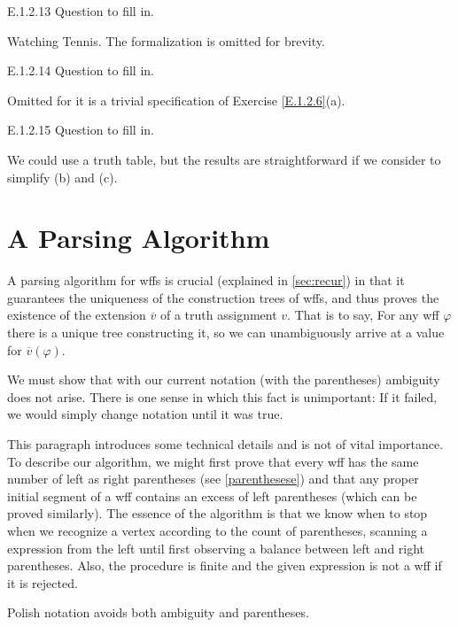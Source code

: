 \begin{exercise}{E.1.2.13}
  Question to fill in.
\end{exercise}

Watching Tennis. The formalization is omitted for brevity.

\begin{exercise}{E.1.2.14}
  Question to fill in.
\end{exercise}

Omitted for it is a trivial specification of Exercise \ref{E.1.2.6}(a).

\begin{exercise}{E.1.2.15}
  Question to fill in.
\end{exercise}

We could use a truth table, but the results are straightforward if we consider to simplify (b) and (c).

\section{A Parsing Algorithm}\label{sec:1.3}

A parsing algorithm for wffs is crucial (explained in \ref{sec:recur}) in that it guarantees the uniqueness of the construction trees of wffs, and thus proves the existence of the extension $\overline{v}$ of a truth assignment $v$. That is to say, For any wff $\varphi$ there is a unique tree constructing it, so we can unambiguously arrive at a value for $\overline{v}(\varphi)$.

We must show that with our current notation (with the parentheses) ambiguity does not arise. There is one sense in which this fact is unimportant: If it failed, we would simply change notation until it was true.

This paragraph introduces some technical details and is not of vital importance. To describe our algorithm, we might first prove that every wff has the same number of left as right parentheses (see \ref{parenthesese}) and that any proper initial segment of a wff contains an excess of left parentheses (which can be proved similarly). The essence of the algorithm is that we know when to stop when we recognize a vertex according to the count of parentheses, scanning a expression from the left until first observing a balance between left and right parentheses. Also, the procedure is finite and the given expression is not a wff if it is rejected.

Polish notation avoids both ambiguity and parentheses.

